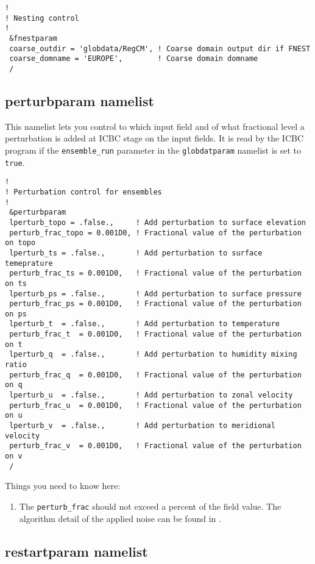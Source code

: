 {\footnotesize
\begin{Verbatim}
!
! Nesting control
!
 &fnestparam
 coarse_outdir = 'globdata/RegCM', ! Coarse domain output dir if FNEST
 coarse_domname = 'EUROPE',        ! Coarse domain domname
 /
\end{Verbatim}
}

\subsection{perturbparam namelist}

This namelist lets you control to which input field and of what fractional
level a perturbation is added at ICBC stage on the input fields.
It is read by the ICBC program if the \verb=ensemble_run= parameter in the
\verb=globdatparam= namelist is set to \verb=true=.

{\footnotesize
\begin{Verbatim}
!
! Perturbation control for ensembles
!
 &perturbparam
 lperturb_topo = .false.,     ! Add perturbation to surface elevation
 perturb_frac_topo = 0.001D0, ! Fractional value of the perturbation on topo
 lperturb_ts = .false.,       ! Add perturbation to surface temeprature
 perturb_frac_ts = 0.001D0,   ! Fractional value of the perturbation on ts
 lperturb_ps = .false.,       ! Add perturbation to surface pressure
 perturb_frac_ps = 0.001D0,   ! Fractional value of the perturbation on ps
 lperturb_t  = .false.,       ! Add perturbation to temperature
 perturb_frac_t  = 0.001D0,   ! Fractional value of the perturbation on t
 lperturb_q  = .false.,       ! Add perturbation to humidity mixing ratio
 perturb_frac_q  = 0.001D0,   ! Fractional value of the perturbation on q
 lperturb_u  = .false.,       ! Add perturbation to zonal velocity
 perturb_frac_u  = 0.001D0,   ! Fractional value of the perturbation on u
 lperturb_v  = .false.,       ! Add perturbation to meridional velocity
 perturb_frac_v  = 0.001D0,   ! Fractional value of the perturbation on v
 /
\end{Verbatim}
}

Things you need to know here:

\begin{enumerate}
\item The \verb=perturb_frac= should not exceed a percent of the field value.
The algorithm detail of the applied noise can be found in \cite{tao_ense}.
\end{enumerate}

\subsection{restartparam namelist}

